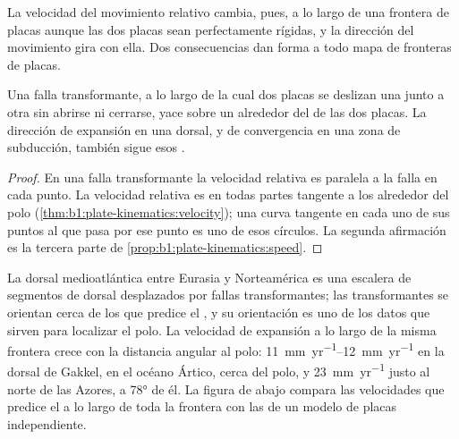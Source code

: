 La velocidad del movimiento relativo cambia, pues, a lo largo de una frontera de placas aunque las dos placas sean perfectamente
rígidas, y la dirección del movimiento gira con ella. Dos consecuencias dan forma a todo mapa de fronteras de placas.

\begin{proposition}\label{prop:b1:plate-kinematics:transforms}
Una falla transformante, a lo largo de la cual dos placas se deslizan una junto a otra sin abrirse ni cerrarse, yace sobre un  alrededor del  de las dos placas. La dirección de expansión en una dorsal, y de convergencia en una zona de
subducción, también sigue esos .
\end{proposition}

\begin{proof}
En una falla transformante la velocidad relativa es paralela a la falla en cada punto. La velocidad relativa es en todas partes tangente
a los  alrededor del polo (\cref{thm:b1:plate-kinematics:velocity}); una curva tangente en cada uno de sus puntos al
 que pasa por ese punto es uno de esos círculos. La segunda afirmación es la tercera parte de
\cref{prop:b1:plate-kinematics:speed}.
\end{proof}

La dorsal medioatlántica entre Eurasia y Norteamérica es una escalera de segmentos de dorsal desplazados por fallas transformantes; las
transformantes se orientan cerca de los  que predice el , y su orientación es uno de los datos que sirven para
localizar el polo. La velocidad de expansión a lo largo de la misma frontera crece con la distancia angular al polo:
\qtyrange{11}{12}{mm.yr^{-1}} en la dorsal de Gakkel, en el océano Ártico, cerca del polo, y \qty{23}{mm.yr^{-1}} justo al norte de las
Azores, a \ang{78} de él. La figura de abajo compara las velocidades que predice el  a lo largo de toda la frontera con
las de un modelo de placas independiente.

